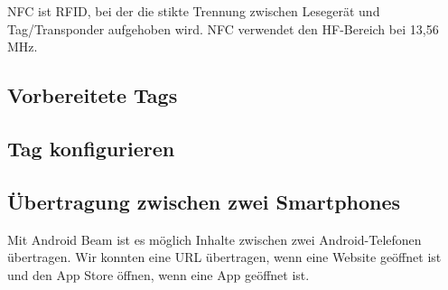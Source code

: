 \documentclass[a4paper,11pt,headsepline,footsepline,parskip=half]{scrartcl}
\begin{document}
NFC ist RFID, bei der die stikte Trennung zwischen Lesegerät und Tag/Transponder aufgehoben wird.
NFC verwendet den HF-Bereich bei 13,56 MHz.

\subsection{Vorbereitete Tags}

\subsection{Tag konfigurieren}

\subsection{Übertragung zwischen zwei Smartphones}

Mit Android Beam ist es möglich Inhalte zwischen zwei Android-Telefonen übertragen.
Wir konnten eine URL übertragen, wenn eine Website geöffnet ist und den App Store
öffnen, wenn eine App geöffnet ist.
\end{document}
